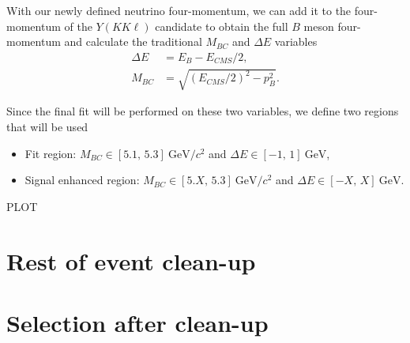 \documentclass[oneside,a4paper,openany,12pt]{scrbook}
\newcommand {\e}[1]{\mathrm{~#1}}
\begin{document}
With our newly defined neutrino four-momentum, we can add it to the four-momentum of the $Y(KK\ell)$ candidate to obtain the full $B$ meson four-momentum and calculate the traditional $M_{BC}$ and $\Delta E$ variables
\begin{align}
\Delta E &= E_B - E_{CMS}/2,\\
M_{BC} &= \sqrt{\left(E_{CMS}/2\right)^2 - p_B^2}.
\end{align}

Since the final fit will be performed on these two variables, we define two regions that will be used
\begin{itemize}
\item Fit region: $M_{BC} \in [5.1,\,5.3]\e{GeV}/c^2$ and $\Delta E \in [-1,\,1]\e{GeV}$,
\item Signal enhanced region: $M_{BC} \in [5.X,\,5.3]\e{GeV}/c^2$ and $\Delta E \in [-X,\,X]\e{GeV}$.
\end{itemize}

\begin{center}
PLOT
\end{center}


\section{Rest of event clean-up}

\section{Selection after clean-up}
\end{document}
